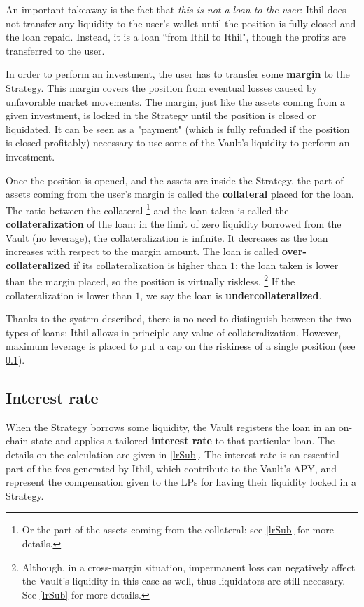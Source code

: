 \documentclass[a4paper,10 pt]{article}
\theoremstyle{definition}
\begin{document}
An important takeaway is the fact that {\it this is not a loan to the user}: Ithil does not transfer any liquidity to the user's wallet until the position is fully closed and the loan repaid. Instead, it is a loan ``from Ithil to Ithil", though the profits are transferred to the user.

In order to perform an investment, the user has to transfer some {\bf margin} to the Strategy. This margin covers the position from eventual losses caused by unfavorable market movements. The margin, just like the assets coming from a given investment, is locked in the Strategy until the position is closed or liquidated. It can be seen as a "payment" (which is fully refunded if the position is closed profitably) necessary to use some of the Vault's liquidity to perform an investment.

Once the position is opened, and the assets are inside the Strategy, the part of assets coming from the user's margin is called the {\bf collateral} placed for the loan. The ratio between the collateral \footnote{Or the part of the assets coming from the collateral: see \ref{lrSub} for more details.} and the loan taken is called the {\bf collateralization} of the loan: in the limit of zero liquidity borrowed from the Vault (no leverage), the collateralization is infinite. It decreases as the loan increases with respect to the margin amount. The loan is called {\bf over-collateralized} if its collateralization is higher than $1$: the loan taken is lower than the margin placed, so the position is virtually riskless. \footnote{Although, in a cross-margin situation, impermanent loss can negatively affect the Vault's liquidity in this case as well, thus liquidators are still necessary. See \ref{lrSub} for more details.} If the collateralization is lower than $1$, we say the loan is {\bf undercollateralized}. 

Thanks to the system described, there is no need to distinguish between the two types of loans: Ithil allows in principle any value of collateralization. However, maximum leverage is placed to put a cap on the riskiness of a single position (see \ref{irSub}).

\subsection{Interest rate}\label{irSub}
When the Strategy borrows some liquidity, the Vault registers the loan in an on-chain state and applies a tailored {\bf interest rate} to that particular loan. The details on the calculation are given in \ref{lrSub}. The interest rate is an essential part of the fees generated by Ithil, which contribute to the Vault's APY, and represent the compensation given to the LPs for having their liquidity locked in a Strategy.
\end{document}
